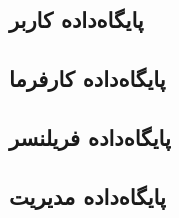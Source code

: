 \subsection{پایگاه‌داده کاربر}


\subsection{پایگاه‌داده کارفرما}


\subsection{پایگاه‌داده فریلنسر}


\subsection{پایگاه‌داده مدیریت}


